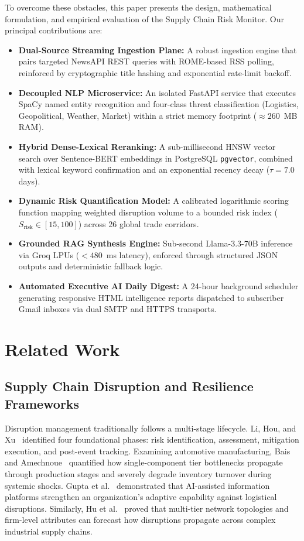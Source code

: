\documentclass[conference]{IEEEtran}
\begin{document}
To overcome these obstacles, this paper presents the design, mathematical formulation, and empirical evaluation of the Supply Chain Risk Monitor. Our principal contributions are:
\begin{itemize}
    \item \textbf{Dual-Source Streaming Ingestion Plane:} A robust ingestion engine that pairs targeted NewsAPI REST queries with ROME-based RSS polling, reinforced by cryptographic title hashing and exponential rate-limit backoff.
    \item \textbf{Decoupled NLP Microservice:} An isolated FastAPI service that executes SpaCy named entity recognition and four-class threat classification (Logistics, Geopolitical, Weather, Market) within a strict memory footprint ($\approx 260$~MB RAM).
    \item \textbf{Hybrid Dense-Lexical Reranking:} A sub-millisecond HNSW vector search over Sentence-BERT embeddings in PostgreSQL \texttt{pgvector}, combined with lexical keyword confirmation and an exponential recency decay ($\tau = 7.0$ days).
    \item \textbf{Dynamic Risk Quantification Model:} A calibrated logarithmic scoring function mapping weighted disruption volume to a bounded risk index ($S_{\text{risk}} \in [15, 100]$) across 26 global trade corridors.
    \item \textbf{Grounded RAG Synthesis Engine:} Sub-second Llama-3.3-70B inference via Groq LPUs ($<480$~ms latency), enforced through structured JSON outputs and deterministic fallback logic.
    \item \textbf{Automated Executive AI Daily Digest:} A 24-hour background scheduler generating responsive HTML intelligence reports dispatched to subscriber Gmail inboxes via dual SMTP and HTTPS transports.
\end{itemize}

\section{Related Work}

\subsection{Supply Chain Disruption and Resilience Frameworks}
Disruption management traditionally follows a multi-stage lifecycle. Li, Hou, and Xu~\cite{li2010managing} identified four foundational phases: risk identification, assessment, mitigation execution, and post-event tracking. Examining automotive manufacturing, Bais and Amechnoue~\cite{bais2023ex} quantified how single-component tier bottlenecks propagate through production stages and severely degrade inventory turnover during systemic shocks. Gupta et al.~\cite{gupta2021ai} demonstrated that AI-assisted information platforms strengthen an organization's adaptive capability against logistical disruptions. Similarly, Hu et al.~\cite{hu2022supply} proved that multi-tier network topologies and firm-level attributes can forecast how disruptions propagate across complex industrial supply chains.
\end{document}
